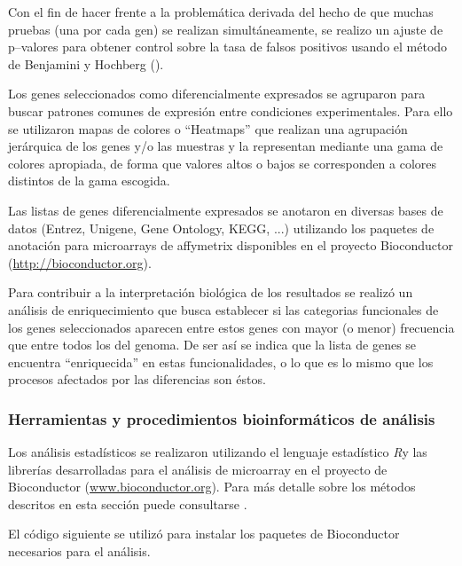 \documentclass[a4paper]{article}\usepackage[]{graphicx}\usepackage[]{color}
\newcommand{\R}{{\it R}}
\begin{document}
Con el fin de hacer frente a la problemática derivada del hecho de que muchas pruebas (una por cada gen) se realizan simultáneamente, se realizo un ajuste de p--valores para obtener control sobre la tasa de falsos positivos usando el método de Benjamini y Hochberg (\cite{BenjaminiHochberg:1995}).


Los genes seleccionados como diferencialmente expresados se agruparon para buscar patrones comunes de expresión entre condiciones experimentales.
Para ello se utilizaron mapas de colores o ``Heatmaps'' que realizan una agrupación jerárquica de los genes y/o las muestras y la representan mediante una gama de colores apropiada, de forma que valores altos o bajos se corresponden a colores distintos de la gama escogida.

Las listas de genes diferencialmente expresados se anotaron en diversas bases de datos (Entrez, Unigene, Gene Ontology, KEGG, ...) utilizando los paquetes de anotación para microarrays de affymetrix disponibles en el proyecto Bioconductor (\url{http://bioconductor.org}).

Para contribuir a la interpretación biológica de los resultados se realizó un análisis de enriquecimiento \cite{Gentleman:2004, Falcon:2007} que busca establecer si las categorias funcionales de los genes seleccionados aparecen entre estos genes con mayor (o menor) frecuencia que entre todos los del genoma. De ser así se indica que la lista de genes se encuentra ``enriquecida'' en estas funcionalidades, o lo que es lo mismo que los procesos afectados por las diferencias son éstos.

\subsubsection{Herramientas y procedimientos  bioinformáticos de análisis}

Los análisis estadísticos se realizaron utilizando el lenguaje estadístico  \R  y las librerías  desarrolladas para el análisis de microarray en el proyecto de Bioconductor (\url{www.bioconductor.org}). Para más detalle sobre los métodos descritos en esta sección puede consultarse \cite{Gentleman:2005}.

El código siguiente se utilizó para instalar los paquetes de Bioconductor necesarios para el análisis.
\end{document}
